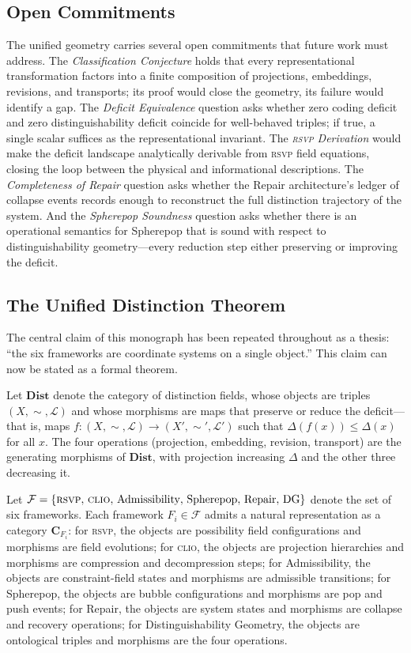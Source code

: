\documentclass[12pt, letterpaper]{article}
\theoremstyle{remark}
\newcommand{\rsvp}{\textsc{rsvp}}
\newcommand{\clio}{\textsc{clio}}
\begin{document}
\subsection{Open Commitments}

The unified geometry carries several open commitments that future work must
address.  The \emph{Classification Conjecture} holds that every
representational transformation factors into a finite composition of
projections, embeddings, revisions, and transports; its proof would close
the geometry, its failure would identify a gap.  The \emph{Deficit
Equivalence} question asks whether zero coding deficit and zero
distinguishability deficit coincide for well-behaved triples; if true, a
single scalar suffices as the representational invariant.  The \emph{\rsvp{}
Derivation} would make the deficit landscape analytically derivable from
\rsvp{} field equations, closing the loop between the physical and
informational descriptions.  The \emph{Completeness of Repair} question
asks whether the Repair architecture's ledger of collapse events records
enough to reconstruct the full distinction trajectory of the system.  And
the \emph{Spherepop Soundness} question asks whether there is an operational
semantics for Spherepop that is sound with respect to distinguishability
geometry---every reduction step either preserving or improving the deficit.

\subsection{The Unified Distinction Theorem}

The central claim of this monograph has been repeated throughout as a
thesis: ``the six frameworks are coordinate systems on a single object.''
This claim can now be stated as a formal theorem.

Let $\mathbf{Dist}$ denote the category of distinction fields, whose objects
are triples $(X, {\sim}, \mathcal{L})$ and whose morphisms are maps that
preserve or reduce the deficit---that is, maps $f: (X, {\sim}, \mathcal{L})
\to (X', {\sim}', \mathcal{L}')$ such that $\Delta(f(x)) \leq \Delta(x)$
for all $x$.  The four operations (projection, embedding, revision,
transport) are the generating morphisms of $\mathbf{Dist}$, with projection
increasing $\Delta$ and the other three decreasing it.

Let $\mathcal{F} = \{\rsvp{},\, \clio{},\, \text{Admissibility},\,
\text{Spherepop},\, \text{Repair},\, \text{DG}\}$ denote the set of six
frameworks.  Each framework $F_i \in \mathcal{F}$ admits a natural
representation as a category $\mathbf{C}_{F_i}$: for \rsvp{}, the objects
are possibility field configurations and morphisms are field evolutions; for
\clio{}, the objects are projection hierarchies and morphisms are
compression and decompression steps; for Admissibility, the objects are
constraint-field states and morphisms are admissible transitions; for
Spherepop, the objects are bubble configurations and morphisms are pop and
push events; for Repair, the objects are system states and morphisms are
collapse and recovery operations; for Distinguishability Geometry, the
objects are ontological triples and morphisms are the four operations.
\end{document}
